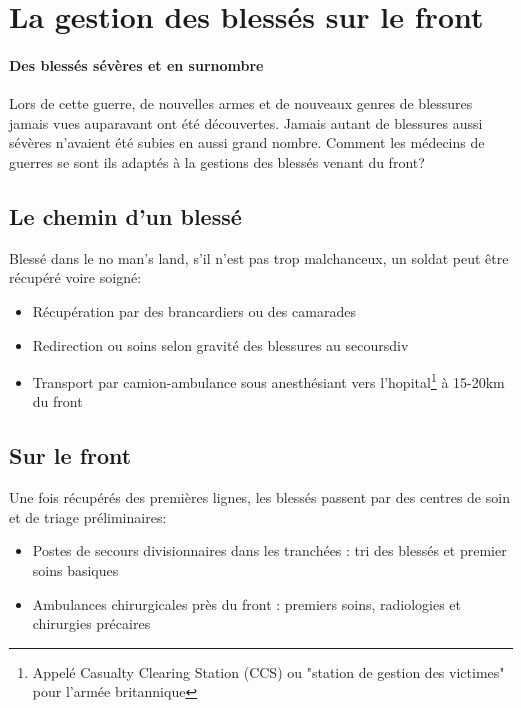 \documentclass[a4paper, BCOR=0mm, fontsize=12pt, titlepage=firstiscover]{scrreprt}
\begin{document}
	
	\section{La gestion des blessés sur le front}
		\paragraph{Des blessés sévères et en surnombre}
		Lors de cette guerre, de nouvelles armes et de nouveaux genres de blessures jamais vues auparavant ont été découvertes.
		Jamais autant de blessures aussi sévères n'avaient été subies en aussi grand nombre.
		Comment les médecins de guerres se sont ils adaptés à la gestions des blessés venant du front?
		
		\subsection{Le chemin d'un blessé}
			Blessé dans le no man's land, s'il n'est pas trop malchanceux, un soldat peut être récupéré voire soigné:
			\begin{itemize}
				\item Récupération par des brancardiers ou des camarades
				\item Redirection ou soins selon gravité des blessures au \gls{secoursdiv}
				\item Transport par camion-ambulance sous anesthésiant vers l'\Gls{hopital}\footnote{Appelé Casualty Clearing Station (CCS) ou "station de gestion des victimes" pour l'armée britannique} à 15-20km du front

			\end{itemize}
		\subsection{Sur le front}
			Une fois récupérés des premières lignes, les blessés passent par des centres de soin et de triage préliminaires:
			\begin{itemize}
				\item Postes de secours divisionnaires dans les tranchées : tri des blessés et premier soins basiques
				\item Ambulances chirurgicales près du front : premiers soins, radiologies et chirurgies précaires
			\end{itemize}
\end{document}
